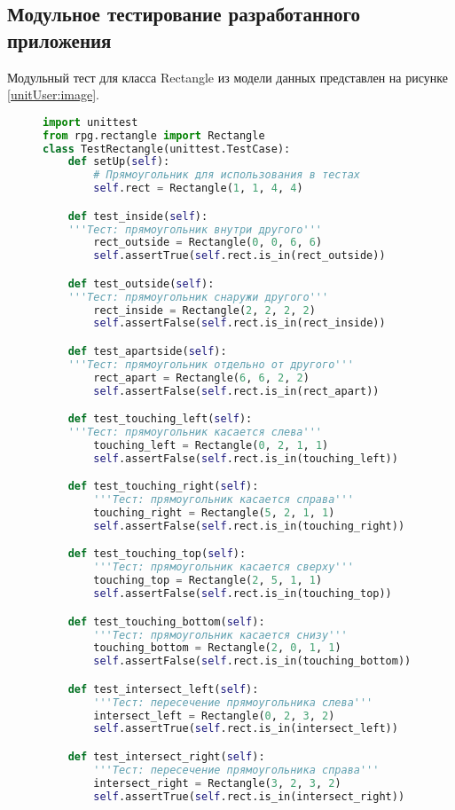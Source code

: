 \subsection{Модульное тестирование разработанного приложения}

Модульный тест для класса Rectangle из модели данных представлен на рисунке \ref{unitUser:image}.

\begin{figure}[ht]
\begin{lstlisting}[language=Python]
import unittest
from rpg.rectangle import Rectangle
class TestRectangle(unittest.TestCase):
	def setUp(self):
		# Прямоугольник для использования в тестах
		self.rect = Rectangle(1, 1, 4, 4)

	def test_inside(self):
	'''Тест: прямоугольник внутри другого'''
		rect_outside = Rectangle(0, 0, 6, 6)
		self.assertTrue(self.rect.is_in(rect_outside))

	def test_outside(self):
	'''Тест: прямоугольник снаружи другого'''
		rect_inside = Rectangle(2, 2, 2, 2)
		self.assertFalse(self.rect.is_in(rect_inside))

	def test_apartside(self):
	'''Тест: прямоугольник отдельно от другого'''
		rect_apart = Rectangle(6, 6, 2, 2)
		self.assertFalse(self.rect.is_in(rect_apart))

	def test_touching_left(self):
	'''Тест: прямоугольник касается слева'''
		touching_left = Rectangle(0, 2, 1, 1)
		self.assertFalse(self.rect.is_in(touching_left))

	def test_touching_right(self):
		'''Тест: прямоугольник касается справа'''
		touching_right = Rectangle(5, 2, 1, 1)
		self.assertFalse(self.rect.is_in(touching_right))

	def test_touching_top(self):
		'''Тест: прямоугольник касается сверху'''
		touching_top = Rectangle(2, 5, 1, 1)
		self.assertFalse(self.rect.is_in(touching_top))

	def test_touching_bottom(self):
		'''Тест: прямоугольник касается снизу'''
		touching_bottom = Rectangle(2, 0, 1, 1)
		self.assertFalse(self.rect.is_in(touching_bottom))

	def test_intersect_left(self):
		'''Тест: пересечение прямоугольника слева'''
		intersect_left = Rectangle(0, 2, 3, 2)
		self.assertTrue(self.rect.is_in(intersect_left))

	def test_intersect_right(self):
		'''Тест: пересечение прямоугольника справа'''
		intersect_right = Rectangle(3, 2, 3, 2)
		self.assertTrue(self.rect.is_in(intersect_right))


\end{lstlisting}
\end{figure}
